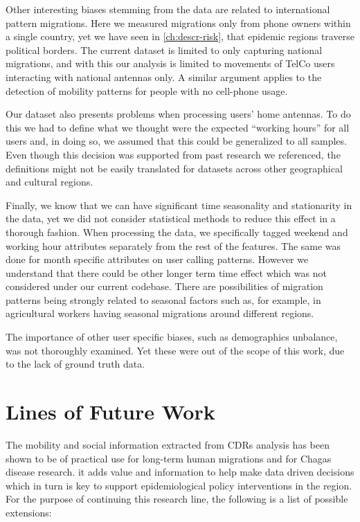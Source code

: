 Other interesting biases stemming from the data are related to international pattern migrations.
Here we measured migrations only from phone owners within a single country, yet we have seen in \cref{ch:descr-risk}, that  epidemic regions traverse political borders.
The current dataset is limited to only capturing national migrations, and with this our analysis is limited to movements of TelCo users interacting with national antennas only.
A similar argument applies to the detection of mobility patterns for people with no cell-phone usage.

Our dataset also presents problems when processing users' home antennas.
To do this we had to define what we thought were the expected ``working hours'' for all users and, in doing so, we assumed that this could be generalized to all samples. %
Even though this decision was supported from past research we referenced, the definitions might not be easily translated for datasets across other geographical and cultural regions.


Finally, we know that we can have significant time seasonality and stationarity in the data, yet we did not consider statistical methods to reduce this effect in a thorough fashion. %
When processing the data, we specifically tagged weekend and working hour attributes separately from the rest of the features.
The same was done for month specific attributes on user calling patterns.
However we understand that there could be other longer term time effect which was not considered under our current codebase. %
There are possibilities of migration patterns being strongly related to seasonal factors such as, for example, in agricultural workers having seasonal migrations around different regions.%

The importance of other user specific biases, such as demographics unbalance, was not thoroughly examined.
Yet these were out of the scope of this work, due to the lack of ground truth data. 


\section{ Lines of Future Work }


The mobility and social information extracted from CDRs analysis has been shown to be of practical use for long-term human migrations and for Chagas disease research.
it adds value and information to help make data driven decisions which in turn is key to support epidemiological policy interventions in the region.
For the purpose of continuing this research line, the following is a list of possible extensions:

